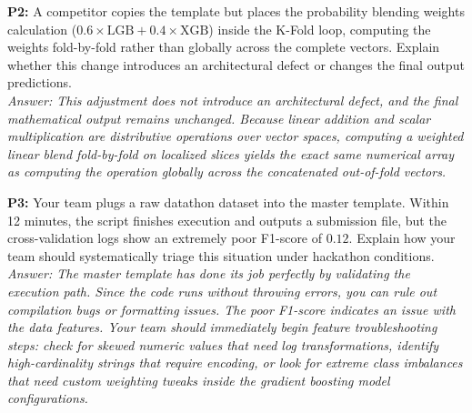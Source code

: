 \documentclass{article}
\begin{document}
\newline
\textbf{P2:} A competitor copies the template but places the probability blending weights calculation ($0.6 \times \text{LGB} + 0.4 \times \text{XGB}$) inside the K-Fold loop, computing the weights fold-by-fold rather than globally across the complete vectors. Explain whether this change introduces an architectural defect or changes the final output predictions.
\\
\textit{Answer: This adjustment does not introduce an architectural defect, and the final mathematical output remains unchanged. Because linear addition and scalar multiplication are distributive operations over vector spaces, computing a weighted linear blend fold-by-fold on localized slices yields the exact same numerical array as computing the operation globally across the concatenated out-of-fold vectors.}

\newline
\textbf{P3:} Your team plugs a raw datathon dataset into the master template. Within 12 minutes, the script finishes execution and outputs a submission file, but the cross-validation logs show an extremely poor F1-score of $0.12$. Explain how your team should systematically triage this situation under hackathon conditions.
\\
\textit{Answer: The master template has done its job perfectly by validating the execution path. Since the code runs without throwing errors, you can rule out compilation bugs or formatting issues. The poor F1-score indicates an issue with the data features. Your team should immediately begin feature troubleshooting steps: check for skewed numeric values that need log transformations, identify high-cardinality strings that require encoding, or look for extreme class imbalances that need custom weighting tweaks inside the gradient boosting model configurations.}
\end{document}
